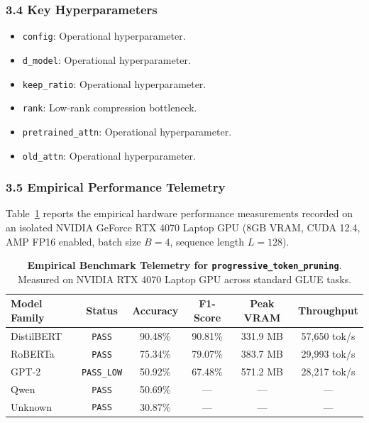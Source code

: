 \subsubsection*{3.4 Key Hyperparameters}
\begin{itemize}
    \item \texttt{config}: Operational hyperparameter.
    \item \texttt{d\_model}: Operational hyperparameter.
    \item \texttt{keep\_ratio}: Operational hyperparameter.
    \item \texttt{rank}: Low-rank compression bottleneck.
    \item \texttt{pretrained\_attn}: Operational hyperparameter.
    \item \texttt{old\_attn}: Operational hyperparameter.
\end{itemize}

\subsubsection*{3.5 Empirical Performance Telemetry}
Table~\ref{tab:telemetry_progressive_token_pruning} reports the empirical hardware performance measurements recorded on an isolated NVIDIA GeForce RTX 4070 Laptop GPU (8GB VRAM, CUDA 12.4, AMP FP16 enabled, batch size $B=4$, sequence length $L=128$).

\begin{table}[h]
\centering
\small
\caption{\textbf{Empirical Benchmark Telemetry for \texttt{progressive\_token\_pruning}}. Measured on NVIDIA RTX 4070 Laptop GPU across standard GLUE tasks.}
\label{tab:telemetry_progressive_token_pruning}
\begin{tabular*}{\columnwidth}{@{\extracolsep{\fill}}lccccc}
\toprule
\textbf{Model Family} & \textbf{Status} & \textbf{Accuracy} & \textbf{F1-Score} & \textbf{Peak VRAM} & \textbf{Throughput} \\
\midrule
DistilBERT & \texttt{PASS} & 90.48\% & 90.81\% & 331.9 MB & 57,650 tok/s \\
RoBERTa & \texttt{PASS} & 75.34\% & 79.07\% & 383.7 MB & 29,993 tok/s \\
GPT-2 & \texttt{PASS\_LOW} & 50.92\% & 67.48\% & 571.2 MB & 28,217 tok/s \\
Qwen & \texttt{PASS} & 50.69\% & --- & --- & --- \\
Unknown & \texttt{PASS} & 30.87\% & --- & --- & --- \\
\bottomrule
\end{tabular*}
\end{table}

